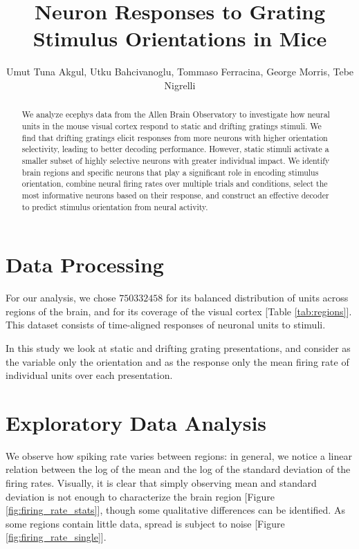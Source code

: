 \documentclass[10pt,twocolumn]{article}
\title{\Large \textbf{Neuron Responses to Grating Stimulus Orientations in Mice}}
\author{
  Umut Tuna Akgul, Utku Bahcivanoglu, Tommaso Ferracina, George Morris, Tebe Nigrelli
}
\date{\today\\ [1ex] \hrule}
\begin{document}
\maketitle
\thispagestyle{empty}
\pagestyle{empty}

\begin{abstract}
  We analyze ecephys data from the Allen Brain Observatory to investigate how neural units in the mouse visual cortex respond to static and drifting gratings stimuli. We find that drifting gratings elicit responses from more neurons with higher orientation selectivity, leading to better decoding performance. However, static stimuli activate a smaller subset of highly selective neurons with greater individual impact. We identify brain regions and specific neurons that play a significant role in encoding stimulus orientation, combine neural firing rates over multiple trials and conditions, select the most informative neurons based on their response, and construct an effective decoder to predict stimulus orientation from neural activity.
\end{abstract}

\section{Data Processing}

For our analysis, we chose $750332458$ for its balanced distribution of units across regions of the brain, and for its coverage of the visual cortex [Table \ref{tab:regions}].  This dataset consists of time-aligned responses of neuronal units to stimuli.

In this study we look at static and drifting grating presentations, and consider as the variable only the orientation and as the response only the mean firing rate of individual units over each presentation.

\section{Exploratory Data Analysis}

We observe how spiking rate varies between regions: in general, we notice a linear relation between the log of the mean and the log of the standard deviation of the firing rates. Visually, it is clear that simply observing mean and standard deviation is not enough to characterize the brain region [Figure \ref{fig:firing_rate_stats}], though some qualitative differences can be identified. As some regions contain little data, spread is subject to noise [Figure \ref{fig:firing_rate_single}].
\end{document}
